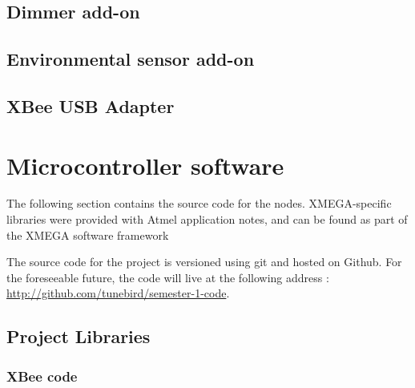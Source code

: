 \subsection{Dimmer add-on}
\label{sub:sch-dimmerboard}


\subsection{Environmental sensor add-on}
\label{sub:sch-sensorsboard}


\subsection{XBee USB Adapter}
\label{sub:sch-usbboard}


\pagebreak
\section{Microcontroller software}
The following section contains the source code for the nodes. XMEGA-specific
libraries were provided with Atmel application notes, and can be found as part
of the XMEGA software framework

The source code for the project is versioned using git and hosted on
Github. For the foreseeable future, the code will live
at the following address : \url{http://github.com/tunebird/semester-1-code}.


\subsection{Project Libraries}
\label{an:project-libs}

\subsubsection{XBee code}



